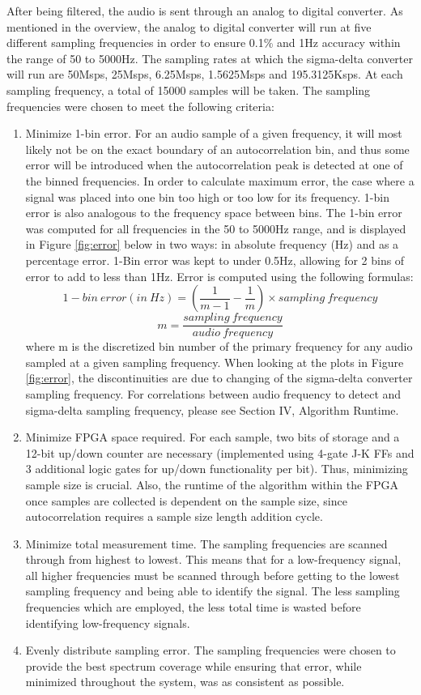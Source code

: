 \documentclass[aps,letterpaper,10pt]{revtex4}
\begin{document}
After being filtered, the audio is sent through an analog to digital converter. As mentioned in the overview, the analog to digital converter will run at five different sampling frequencies in order to ensure 0.1\% and 1Hz accuracy within the range of 50 to 5000Hz. The sampling rates at which the sigma-delta converter will run are 50Msps, 25Msps, 6.25Msps, 1.5625Msps and 195.3125Ksps. At each sampling frequency, a total of 15000 samples will be taken. The sampling frequencies were chosen to meet the following criteria:
\begin{enumerate}
\item Minimize 1-bin error. For an audio sample of a given frequency, it will most likely not be on the exact boundary of an autocorrelation bin, and thus some error will be introduced when the autocorrelation peak is detected at one of the binned frequencies. In order to calculate maximum error, the case where a signal was placed into one bin too high or too low for its frequency. 1-bin error is also analogous to the frequency space between bins. The 1-bin error was computed for all frequencies in the 50 to 5000Hz range, and is displayed in Figure \ref{fig:error} below in two ways: in absolute frequency (Hz) and as a percentage error. 1-Bin error was kept to under 0.5Hz, allowing for 2 bins of error to add to less than 1Hz. Error is computed using the following formulas:
$$ 1-bin~error(in~Hz) = (\frac{1}{m - 1} - \frac{1}{m})\times sampling~frequency$$
$$ m = \frac{sampling~frequency}{audio~frequency}$$
where m is the discretized bin number of the primary frequency for any audio sampled at a given sampling frequency. When looking at the plots in Figure \ref{fig:error}, the discontinuities are due to changing of the sigma-delta converter sampling frequency. For correlations between audio frequency to detect and sigma-delta sampling frequency, please see Section IV, Algorithm Runtime. 
\item Minimize FPGA space required. For each sample, two bits of storage and a 12-bit up/down counter are necessary (implemented using 4-gate J-K FFs and 3 additional logic gates for up/down functionality per bit). Thus, minimizing sample size is crucial. Also, the runtime of the algorithm within the FPGA once samples are collected is dependent on the sample size, since autocorrelation requires a sample size length addition cycle. 
\item Minimize total measurement time. The sampling frequencies are scanned through from highest to lowest. This means that for a low-frequency signal, all higher frequencies must be scanned through before getting to the lowest sampling frequency and being able to identify the signal. The less sampling frequencies which are employed, the less total time is wasted before identifying low-frequency signals. 
\item Evenly distribute sampling error. The sampling frequencies were chosen to provide the best spectrum coverage while ensuring that error, while minimized throughout the system, was as consistent as possible. 
\end{enumerate}
\end{document}
